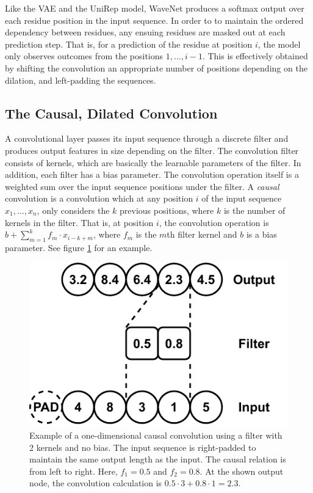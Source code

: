 Like the VAE and the UniRep model, WaveNet produces a softmax output over each residue position in the input sequence. In order to to maintain the ordered dependency between residues, any ensuing residues are masked out at each prediction step. That is, for a prediction of the residue at position $i$, the model only observes outcomes from the positions $1, \ldots, i - 1$. This is effectively obtained by shifting the convolution an appropriate number of positions depending on the dilation, and left-padding the sequences.


\subsection{The Causal, Dilated Convolution}
\label{sec:convolution}
A convolutional layer passes its input sequence through a discrete filter and produces output features in size depending on the filter. The convolution filter consists of kernels, which are basically the learnable parameters of the filter. In addition, each filter has a bias parameter. The convolution operation itself is a weighted sum over the input sequence positions under the filter. A \textit{causal} convolution is a convolution which at any position $i$ of the input sequence $x_1, \ldots, x_n$, only considers the $k$ previous positions, where $k$ is the number of kernels in the filter. That is, at position $i$, the convolution operation is $b + \sum_{m=1}^k f_m \cdot x_{i - k + m}$, where $f_m$ is the $m$th filter kernel and $b$ is a bias parameter. See figure \ref{fig:convolution} for an example.

\begin{figure}[H]
    \centering
    \includegraphics{report/figures/convolution.pdf}
    \caption{Example of a one-dimensional causal convolution using a filter with 2 kernels and no bias. The input sequence is right-padded to maintain the same output length as the input. The causal relation is from left to right. Here, $f_1 = 0.5$ and $f_2 = 0.8$. At the shown output node, the convolution calculation is $0.5 \cdot 3 + 0.8 \cdot 1 = 2.3$.}
    \label{fig:convolution}
\end{figure}

